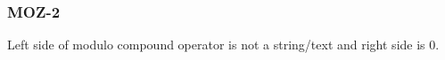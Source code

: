 \subsubsection{MOZ-2}\label{sec:error_code_moz_2}

Left side of modulo compound operator is not a string/text and right side is 0.


